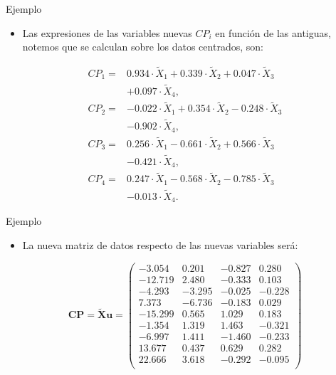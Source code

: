 \documentclass[
  ignorenonframetext,
]{beamer}
\providecommand{\tightlist}{%
  \setlength{\itemsep}{0pt}\setlength{\parskip}{0pt}}
\begin{document}
\begin{frame}{Ejemplo}
\label{ejemplo-5}
\begin{itemize}
\tightlist
\item
  Las expresiones de las variables nuevas \(CP_i\) en función de las
  antiguas, notemos que se calculan sobre los datos centrados, son:
\end{itemize}

\[
\begin{array}{rl}
CP_1 = & 0.934\cdot \tilde{X}_1 + 0.339\cdot \tilde{X}_2 + 0.047\cdot
\tilde{X}_3\\ & + 0.097 \cdot \tilde{X}_4, \\
CP_2 = & -0.022\cdot \tilde{X}_1 +0.354\cdot \tilde{X}_2 -0.248 \cdot
\tilde{X}_3 \\ & -0.902 \cdot \tilde{X}_4, \\
CP_3 = & 0.256\cdot \tilde{X}_1 -0.661 \cdot \tilde{X}_2 +0.566\cdot \tilde{X}_3
\\ &-0.421\cdot \tilde{X}_4, \\
CP_4 = & 0.247 \cdot \tilde{X}_1 - 0.568\cdot \tilde{X}_2 - 0.785\cdot
\tilde{X}_3 \\ & - 0.013 \cdot \tilde{X}_4.
\end{array}
\]
\end{frame}

\begin{frame}{Ejemplo}
\label{ejemplo-6}
\begin{itemize}
\tightlist
\item
  La nueva matriz de datos respecto de las nuevas variables será:
\end{itemize}

\[
\mathbf{CP}= \tilde{\mathbf{X}} \mathbf{u} =
\left(
\begin{array}{rrrr}
-3.054 & 0.201 & -0.827 & 0.280 \\
-12.719 & 2.480 & -0.333 & 0.103 \\
-4.293 & -3.295 & -0.025 & -0.228 \\
7.373 & -6.736 & -0.183 & 0.029 \\
-15.299 & 0.565 & 1.029 & 0.183 \\
-1.354 & 1.319 & 1.463 & -0.321 \\
-6.997 & 1.411 & -1.460 & -0.233 \\
13.677 & 0.437 & 0.629 & 0.282 \\
22.666 & 3.618 & -0.292 & -0.095 \\
\end{array}
\right)
\]
\end{frame}
\end{document}
